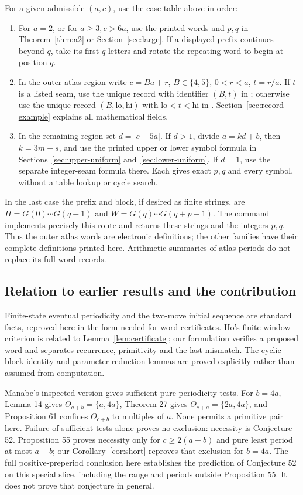 \documentclass[11pt]{article}
\theoremstyle{remark}\newtheorem{remark}[theorem]{Remark}
\begin{document}
For a given admissible $(a,c)$, use the case table above in order:
\begin{enumerate}
\item For $a=2$, or for $a\ge3,c>6a$, use the printed words and $p,q$
in Theorem~\ref{thm:a2} or Section~\ref{sec:large}. If a displayed prefix
continues beyond $q$, take its first $q$ letters and rotate the repeating
word to begin at position $q$.
\item In the outer atlas region write $c=Ba+r$, $B\in\{4,5\}$,
$0<r<a$, $t=r/a$. If $t$ is a listed seam, use the unique record with
identifier $(B,t)$ in ; otherwise use the
unique record $(B,\mathrm{lo},\mathrm{hi})$ with
$\mathrm{lo}<t<\mathrm{hi}$ in .
Section~\ref{sec:record-example} explains all mathematical fields.
\item In the remaining region set $d=|c-5a|$. If $d>1$, divide
$a=kd+b$, then $k=3m+s$, and use the printed upper or lower symbol
formula in Sections~\ref{sec:upper-uniform} and~\ref{sec:lower-uniform}.
If $d=1$, use the separate integer-seam formula there. Each gives exact
$p,q$ and every symbol, without a table lookup or cycle search.
\end{enumerate}
In the last case the prefix and block, if desired as finite strings, are
$H=G(0)\cdots G(q-1)$ and $W=G(q)\cdots G(q+p-1)$.
The command  implements precisely this
route and returns these strings and the integers $p,q$. Thus the outer
atlas words are electronic definitions; the other families have their
complete definitions printed here. Arithmetic summaries of atlas periods
do not replace its full word records.

\subsection{Relation to earlier results and the contribution}\label{sec:literature}
Finite-state eventual periodicity and the two-move initial sequence are
standard facts, reproved here in the form needed for word certificates.
Ho's finite-window criterion \cite[Lemma 1]{Ho} is related to
Lemma~\ref{lem:certificate}; our formulation verifies a proposed word and
separates recurrence, primitivity and the last mismatch. The cyclic block
identity and parameter-reduction lemmas are proved explicitly rather than
assumed from computation.

Manabe's inspected version \cite{Manabe} gives sufficient pure-periodicity
tests. For $b=4a$, Lemma 14 gives
$\Theta_{a+b}=\{a,4a\}$, Theorem 27 gives
$\Theta_{c+a}=\{2a,4a\}$, and Proposition 61 confines
$\Theta_{c+b}$ to multiples of $a$. None permits a primitive pair here.
Failure of sufficient tests alone proves no exclusion: necessity is
Conjecture 52. Proposition 55 proves necessity only for
$c\ge2(a+b)$ and pure least period at most $a+b$; our
Corollary~\ref{cor:short} reproves that exclusion for $b=4a$.
The full positive-preperiod conclusion here establishes the prediction
of Conjecture 52 on this special slice, including the range and periods
outside Proposition 55. It does not prove that conjecture in general.
\end{document}
